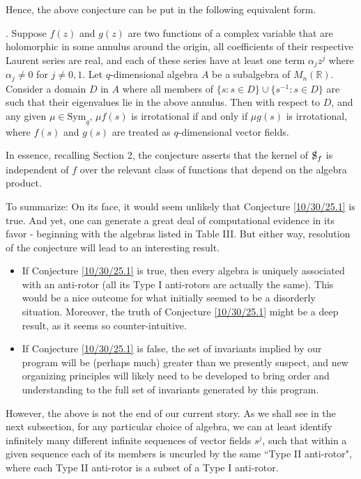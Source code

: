 \documentclass{amsart}
\theoremstyle{definition}
\numberwithin{theorem}{section}
\numberwithin{equation}{section}
\begin{document}
Hence, the above conjecture can be put in the following equivalent form.

\medskip

.  Suppose $f(z)$ and $g(z)$ are two functions of a complex variable that are holomorphic in some annulus around the origin, all coefficients of their respective Laurent series are real, and each of these series have at least one term $\alpha_j z^j$ where $\alpha_j\ne 0$ for $j\ne 0,1$.  Let $q$-dimensional algebra $A$ be a subalgebra of $M_n(\mathbb{R})$.  Consider a domain $D$ in $A$ where all members of \mbox{$\{s: s\in D\}\cup \{s^{-1}: s\in D\}$} are such that their eigenvalues lie in the above annulus.   Then with respect to $D$, and any given $\mu\in \text{Sym}_q$, $\mu f(s)$ is irrotational if and only if $\mu g(s)$ is irrotational, where $f(s)$ and $g(s)$ are treated as $q$-dimensional vector fields. 

\medskip

In essence, recalling Section 2, the conjecture asserts that the kernel of $\slashed{\text{S}}_f$ is independent of $f$ over the relevant class of functions that depend on the algebra product. 

To summarize: On its face, it would seem unlikely that Conjecture \ref{10/30/25.1} is true.  And yet, one can generate a great deal of computational evidence in its favor - beginning with the algebras listed in Table III.   But either way, resolution of the conjecture will lead to an interesting result.
\begin{itemize}\item If Conjecture \ref{10/30/25.1} is true, then every algebra is uniquely associated with an anti-rotor (all its Type I anti-rotors are actually the same).  This would be a nice outcome for what initially seemed to be a disorderly situation.  Moreover, the truth of Conjecture \ref{10/30/25.1} might be a deep result, as it seems so counter-intuitive.  \item
If Conjecture \ref{10/30/25.1} is false, the set of invariants implied by our program will be (perhaps much) greater than we presently suspect, and new organizing principles will likely need to be developed to bring order and understanding to the full set of invariants generated by this program.
\end{itemize} 

However, the above is not the end of our current story.  As we shall see in the next subsection, for any particular choice of algebra, we can at least identify infinitely many different infinite sequences of vector fields $s^j$, such that within a given sequence each of its members is uncurled by the same ``Type II anti-rotor", where each Type II anti-rotor is a subset of a Type I anti-rotor.
\end{document}
